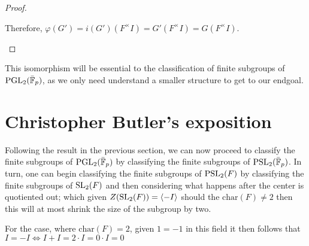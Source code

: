 \begin{proof}
\begin{itemize}
\begin{itemize}
    Therefore, $\varphi(G') = i(G') (F^\times I) = G' (F^\times I) = G (F^\times I)$.
\end{itemize}


\end{itemize}

\end{proof}

This isomorphism will be essential to the classification of finite subgroups of $\operatorname{PGL}_2(\bar{\mathbb{F}}_p)$, as we only need understand a smaller structure to get to our endgoal.


\section{Christopher Butler's exposition}

Following the result in the previous section, we can now proceed to classify the finite subgroups of $\operatorname{PGL}_2(\bar{\mathbb{F}}_p)$ by classifying the finite subgroups of $\operatorname{PSL}_2(\bar{\mathbb{F}}_p)$. In turn, one can begin classifying the finite subgroups of $\operatorname{PSL}_2(F)$ by classifying the finite subgroups of $\operatorname{SL}_2(F)$ and then considering what happens after the center is quotiented out; which given $Z(\operatorname{SL}_2(F)) = \langle -I\rangle$ should the $\textrm{char}(F) \ne 2$ then this will at most shrink the size of the subgroup by two. 

For the case, where $\textrm{char}(F) = 2$, given $1 = -1$ in this field it then follows that $I = -I \iff I + I =  2 \cdot I = 0 \cdot I = 0$
